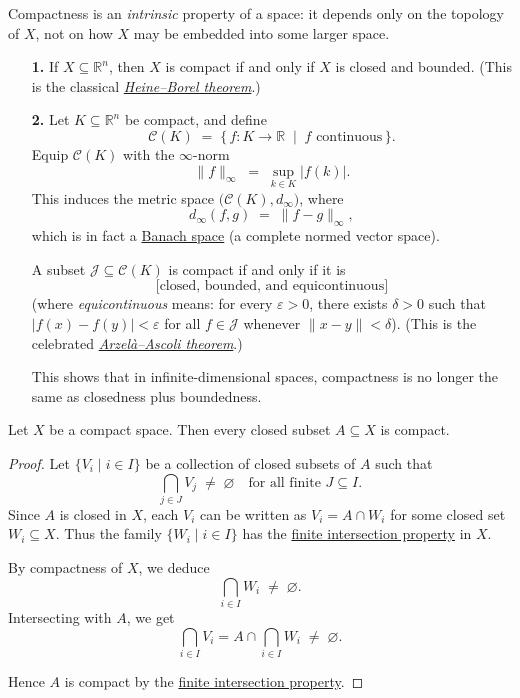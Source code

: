 Compactness is an \emph{intrinsic} property of a space: it depends only on the topology of \(X\), not on how \(X\) may be embedded into some larger space.

\begin{example}
\leavevmode
\begin{enumerate}
\item[\textbf{1.}] 
If \(X \subseteq \mathbb{R}^n\), then \(X\) is compact if and only if \(X\) is closed and bounded.  
(This is the classical \href{https://en.wikipedia.org/wiki/Heine%E2%80%93Borel_theorem}{\emph{Heine--Borel theorem}}.)

\item[\textbf{2.}] 
Let \(K \subseteq \mathbb{R}^n\) be compact, and define
\[
\mathcal{C}(K) \;=\; \{\, f : K \to \mathbb{R} \;\mid\; f \text{ continuous} \,\}.
\]
Equip \(\mathcal{C}(K)\) with the \(\infty\)-norm
\[
\|f\|_\infty \;=\; \sup_{k \in K} |f(k)|.
\]
This induces the metric space \(\bigl(\mathcal{C}(K), d_\infty \bigr)\), where
\[
d_\infty(f,g) \;=\; \|f-g\|_\infty,
\]
which is in fact a \href{https://en.wikipedia.org/wiki/Banach_space}{Banach space} (a complete normed vector space).

A subset \(\mathcal{J} \subseteq \mathcal{C}(K)\) is compact if and only if it is
\[
\bigl[\text{closed, bounded, and equicontinuous}\bigr]
\]
(where \emph{equicontinuous} means: for every \(\varepsilon > 0\), there exists \(\delta > 0\) such that 
\(|f(x)-f(y)| < \varepsilon\) for all \(f \in \mathcal{J}\) whenever \(\|x-y\| < \delta\)).  
(This is the celebrated \href{https://en.wikipedia.org/wiki/Arzel%C3%A0%E2%80%93Ascoli_theorem}{\emph{Arzelà--Ascoli theorem}}.)

\medskip
This shows that in infinite-dimensional spaces, compactness is no longer the same as closedness plus boundedness.
\end{enumerate}
\end{example}

\begin{proposition}
\label{prop:closed_subsets_compact}
Let \(X\) be a compact space. Then every closed subset \(A \subseteq X\) is compact.
\end{proposition}

\begin{proof}
Let \(\{V_i \mid i \in I\}\) be a collection of closed subsets of \(A\) such that 
\[
\bigcap_{j \in J} V_j \;\neq\; \varnothing 
\quad\text{for all finite } J \subseteq I.
\]
Since \(A\) is closed in \(X\), each \(V_i\) can be written as \(V_i = A \cap W_i\) for some closed set \(W_i \subseteq X\).  
Thus the family \(\{W_i \mid i \in I\}\) has the \hyperref[prop:FIP]{finite intersection property} in \(X\).  

By compactness of \(X\), we deduce
\[
\bigcap_{i \in I} W_i \;\neq\; \varnothing.
\]
Intersecting with \(A\), we get
\[
\bigcap_{i \in I} V_i 
= A \cap \bigcap_{i \in I} W_i 
\;\neq\; \varnothing.
\]

Hence \(A\) is compact by the \hyperref[prop:FIP]{finite intersection property}.
\end{proof}

